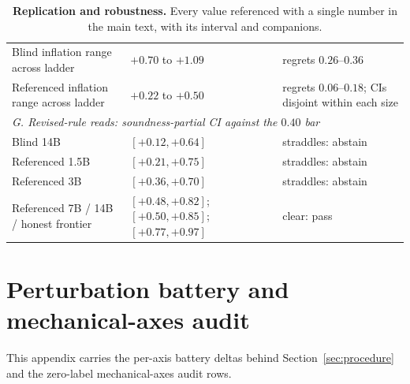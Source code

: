 \begin{table}[ht]
\begin{tabular}{p{7.2cm}p{3.2cm}p{3.6cm}}
Blind inflation range across ladder & $+0.70$ to $+1.09$ & regrets $0.26$--$0.36$ \\
Referenced inflation range across ladder & $+0.22$ to $+0.50$ & regrets $0.06$--$0.18$; CIs disjoint within each size \\
\midrule
\multicolumn{3}{l}{\emph{G. Revised-rule reads: soundness-partial CI against the $0.40$ bar}} \\
Blind 14B & $[+0.12, +0.64]$ & straddles: abstain \\
Referenced 1.5B & $[+0.21, +0.75]$ & straddles: abstain \\
Referenced 3B & $[+0.36, +0.70]$ & straddles: abstain \\
Referenced 7B / 14B / honest frontier & $[+0.48, +0.82]$; $[+0.50, +0.85]$; $[+0.77, +0.97]$ & clear: pass \\
\bottomrule
\end{tabular}
\caption{\textbf{Replication and robustness.} Every value referenced with a single number in the main text, with its interval and companions.}
\label{tab:robust}
\end{table}

\section{Perturbation battery and mechanical-axes audit}
\label{app:battery}
This appendix carries the per-axis battery deltas behind Section~\ref{sec:procedure} and the zero-label mechanical-axes audit rows.

